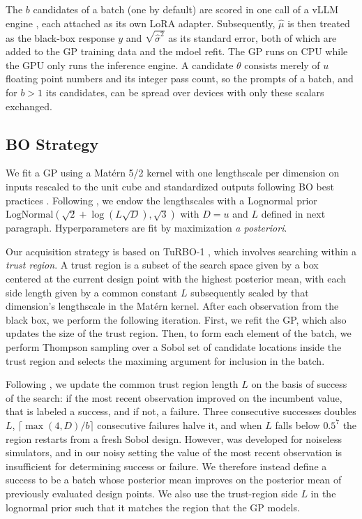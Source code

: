 \documentclass[twoside]{article}
\begin{document}
The $b$ candidates of a batch (one by default) are scored in one call of a vLLM engine \citep{kwon2023vllm}, each attached as its own LoRA adapter.
Subsequently, $\hat\mu$ is then treated as the black-box response $y$ and $\sqrt{\hat\sigma^2}$ as its standard error, both of which are added to the GP training data and the mdoel refit.
The GP runs on CPU while the GPU only runs the inference engine.
A candidate $\theta$ consists merely of $u$ floating point numbers and its integer pass count, so the prompts of a batch, and for $b > 1$ its candidates, can be spread over devices with only these scalars exchanged.

\subsection{BO Strategy}

We fit a GP using a Mat\'ern 5/2 kernel with one lengthscale per dimension on inputs rescaled to the unit cube and standardized outputs following BO best practices \citep{snoek2012practical}.
Following \citet{hvarfner2024vanilla}, we endow the lengthscales with a Lognormal prior $\mathrm{LogNormal}(\sqrt{2} + \log(L\sqrt{D}), \sqrt{3})$ with $D = u$ and $L$ defined in next paragraph.
Hyperparameters are fit by maximization \textit{a posteriori}.

Our acquisition strategy is based on TuRBO-1 \citep{eriksson2019turbo}, which involves searching within a \textit{trust region}.
A trust region is a subset of the search space given by a box centered at the current design point with the highest posterior mean, with each side length given by a common constant $L$ subsequently scaled by that dimension's lengthscale in the Mat\'ern kernel.
After each observation from the black box, we perform the following iteration.
First, we refit the GP, which also updates the size of the trust region.
Then, to form each element of the batch, we perform Thompson sampling over a Sobol set of candidate locations inside the trust region and selects the maximing argument for inclusion in the batch.

Following \citet{eriksson2019turbo}, we update the common trust region length $L$ on the basis of success of the search: if the most recent observation improved on the incumbent value, that is labeled a success, and if not, a failure. 
Three consecutive successes doubles $L$, $\lceil \max(4, D)/b \rceil$ consecutive failures halve it, and when $L$ falls below $0.5^7$ the region restarts from a fresh Sobol design.
However, \citet{eriksson2019turbo} was developed for noiseless simulators, and in our noisy setting the value of the most recent observation is insufficient for determining success or failure.
We therefore instead define a success to be a batch whose posterior mean improves on the posterior mean of previously evaluated design points.
We also use  the trust-region side $L$ in the lognormal prior such that it matches the region that the GP models. 
\end{document}

